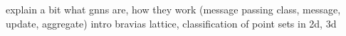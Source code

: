 explain a bit what gnns are, how they work (message passing class, message, update, aggregate)
intro bravias lattice, classification of point sets in 2d, 3d